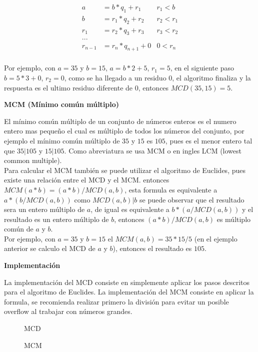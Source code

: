 \documentclass[12pt, a4paper]{article}
\newcommand\cppfile[2][]{

}
\newcommand{\subtitulo}[1]{\begin{center}\textbf{#1}\end{center}}
\begin{document}
	\begin{align*}
		a &= b*q_{1} + r_{1} & r_{1} < b\\
		b &= r_{1}*q_{2} + r_{2} & r_{2} < r_{1} \\
		r_{1} &= r_{2}*q_{3} + r_{3} & r_{3} < r_{2} \\
		...\\
		r_{n-1} &= r_{n}*q_{n+1} + 0 & 0 < r_{n} \\
	\end{align*}
	
	Por ejemplo, con $a = 35$ y $b = 15$, $a = b*2 + 5$, $r_{1} = 5$, en el siguiente paso $b = 5*3 + 0$, $r_{2} = 0$, 
	como se ha llegado a un residuo $0$, el algoritmo finaliza y la respuesta es el ultimo residuo diferente de $0$,
	entonces $MCD(35,15) = 5$.\\
	
	\subtitulo{MCM (Mínimo común múltiplo)}
	
	El mínimo común múltiplo de un conjunto de números enteros es el numero entero mas pequeño el cual es múltiplo de
	todos los números del conjunto, por ejemplo el mínimo común múltiplo de $35$ y $15$ es $105$, pues es el menor entero
	tal que $35|105$ y $15|105$. Como abreviatura se usa MCM o en ingles LCM (lowest common multiple).\\
	
	Para calcular el MCM también se puede utilizar el algoritmo de Euclides, pues existe una relación entre el MCD
	y el MCM. entonces $MCM(a*b) = (a*b)/MCD(a,b)$, esta formula es equivalente
	a $a*(b/MCD(a,b))$ como $MCD(a,b) | b$ se puede observar que el resultado sera un entero múltiplo de $a$, de igual
	es equivalente a $b*(a/MCD(a,b))$ y el resultado es un entero múltiplo de $b$, entonces $(a*b)/MCD(a,b)$
	es múltiplo común de $a$ y $b$.\\
	
	Por ejemplo, con $a = 35$ y $b = 15$ el $MCM(a,b) = 35*15/5$ (en el ejemplo anterior se calculo el MCD 
	de $a$ y $b$), entonces el resultado es $105$.
	
	\subtitulo{Implementación}
	
	La implementación del MCD consiste en simplemente aplicar los pasos descritos para el algoritmo de Euclides. La 
	implementación del MCM consiste en aplicar la formula, se recomienda realizar primero la división para evitar un  
	posible overflow al trabajar con números grandes.
	
	\begin{figure}[!htb]
			\centering
			\cppfile[5-8]{Matematicas/codigos/MCD_y_MCM.cpp}
			MCD
		\endminipage
			\centering
			\cppfile[10-12]{Matematicas/codigos/MCD_y_MCM.cpp}
			MCM
		\endminipage
	\end{figure}
	
\end{document}
